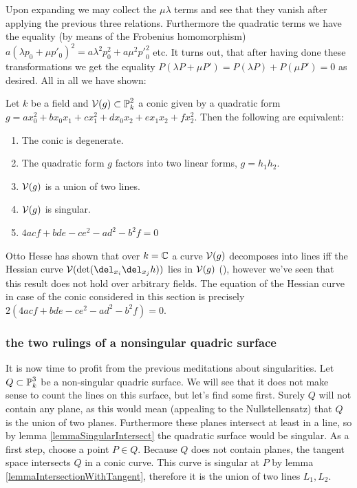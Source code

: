 Upon expanding we may collect the $\mu\lambda$ terms and see that they vanish after applying the previous three relations.
Furthermore the quadratic terms we have the equality (by means of the Frobenius homomorphism)
$a(\lambda p_0 + \mu p'_0)^2 = a\lambda^2p_0^2 + a \mu^2 {p'}_0^2$ etc.
It turns out, that after having done these transformations we get the equality $P(\lambda P + \mu P') = P(\lambda P) + P(\mu P') = 0$ as desired.
All in all we have shown:

\begin{theorem}
Let $k$ be a field and $\operatorname{\mathcal V}(g) \subset \operatorname{\mathbb P}^2_k$ a conic given by a quadratic form $g = ax_0^2 + bx_0x_1 + cx_1^2 + dx_0x_2 + ex_1x_2 + fx_2^2$.
Then the following are equivalent:
\begin{enumerate}
\item The conic is degenerate.
\item The quadratic form $g$ factors into two linear forms, $g=h_1h_2$.
\item $\operatorname{\mathcal V}(g)$ is a union of two lines.
\item $\operatorname{\mathcal V}(g)$ is singular.
\item $4acf + bde - ce^2 - ad^2 - b^2f = 0$
\end{enumerate}
\end{theorem}


\begin{remark}
Otto Hesse has shown that over $k=\operatorname{\mathbb C}$ a curve $\operatorname{\mathcal V}(g)$ decomposes into lines iff the Hessian curve $\V(\det(\del_{x_i}\del_{x_j}h))$ lies in $\operatorname{\mathcal V}(g)$ (\cite[p.289]{brieskorn2012plane}), however we've seen that this result does not hold over arbitrary fields.
The equation of the Hessian curve in case of the conic considered in this section is precisely $2(4acf + bde - ce^2 - ad^2 - b^2f) = 0$.
\end{remark}


\subsubsection{the two rulings of a nonsingular quadric surface}


It is now time to profit from the previous meditations about singularities.
Let $Q \subset \operatorname{\mathbb P}^3_k$ be a non-singular quadric surface.
We will see that it does not make sense to count the lines on this surface, but let's find some first.
Surely $Q$ will not contain any plane, as this would mean (appealing to the Nullstellensatz) that $Q$ is the union of two planes.
Furthermore these planes intersect at least in a line, so by lemma \ref{lemmaSingularIntersect} the quadratic surface would be singular.
As a first step, choose a point $P \in Q$.
Because $Q$ does not contain planes, the tangent space intersects $Q$ in a conic curve.
This curve is singular at $P$ by lemma \ref{lemmaIntersectionWithTangent}, therefore it is the union of two lines $L_1,L_2$.

